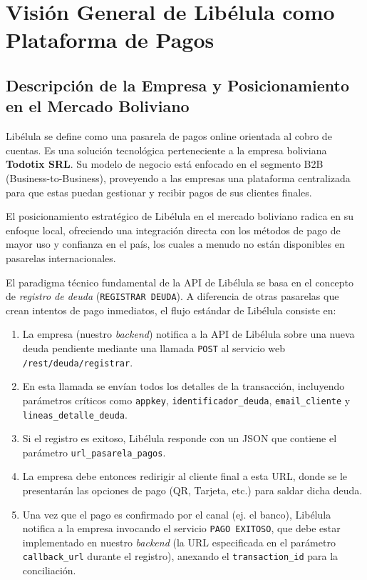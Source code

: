 \section{Visión General de Libélula como Plataforma de Pagos}

    \subsection{Descripción de la Empresa y Posicionamiento en el Mercado Boliviano}
        Libélula se define como una pasarela de pagos online orientada al cobro de cuentas. Es una solución tecnológica perteneciente 
        a la empresa boliviana \textbf{Todotix SRL}. Su modelo de negocio está enfocado en el segmento B2B (Business-to-Business), 
        proveyendo a las empresas una plataforma centralizada para que estas puedan gestionar y recibir pagos de sus clientes finales.\par

        El posicionamiento estratégico de Libélula en el mercado boliviano radica en su enfoque local, ofreciendo una integración 
        directa con los métodos de pago de mayor uso y confianza en el país, los cuales a menudo no están disponibles en pasarelas 
        internacionales.\par

        El paradigma técnico fundamental de la API de Libélula se basa en el concepto de \emph{registro de deuda} (\texttt{REGISTRAR DEUDA}). 
        A diferencia de otras pasarelas que crean intentos de pago inmediatos, el flujo estándar de Libélula consiste en:\par

        \begin{enumerate}
            \item La empresa (nuestro \emph{backend}) notifica a la API de Libélula sobre una nueva deuda pendiente mediante una llamada \texttt{POST} al servicio web \texttt{/rest/deuda/registrar}.
            \item En esta llamada se envían todos los detalles de la transacción, incluyendo parámetros críticos como \texttt{appkey}, \texttt{identificador\_deuda}, \texttt{email\_cliente} y \texttt{lineas\_detalle\_deuda}.
            \item Si el registro es exitoso, Libélula responde con un JSON que contiene el parámetro \texttt{url\_pasarela\_pagos}.
            \item La empresa debe entonces redirigir al cliente final a esta URL, donde se le presentarán las opciones de pago (QR, Tarjeta, etc.) para saldar dicha deuda.
            \item Una vez que el pago es confirmado por el canal (ej. el banco), Libélula notifica a la empresa invocando el servicio \texttt{PAGO EXITOSO}, que debe estar implementado en nuestro \emph{backend} (la URL especificada en el parámetro \texttt{callback\_url} durante el registro), anexando el \texttt{transaction\_id} para la conciliación.
        \end{enumerate}

